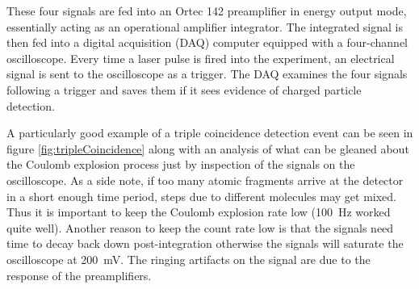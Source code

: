 These four signals are fed into an Ortec 142 preamplifier in energy output mode, essentially acting as an operational amplifier integrator. The integrated signal is then fed into a digital acquisition (DAQ) computer equipped with a four-channel oscilloscope. Every time a laser pulse is fired into the experiment, an electrical signal is sent to the oscilloscope as a trigger. The DAQ examines the four signals following a trigger and saves them if it sees evidence of charged particle detection.

A particularly good example of a triple coincidence detection event can be seen in figure \ref{fig:tripleCoincidence} along with an analysis of what can be gleaned about the Coulomb explosion process just by inspection of the signals on the oscilloscope. As a side note, if too many atomic fragments arrive at the detector in a short enough time period, steps due to different molecules may get mixed. Thus it is important to keep the Coulomb explosion rate low (\SI{100}{\Hz} worked quite well). Another reason to keep the count rate low is that the signals need time to decay back down post-integration otherwise the signals will saturate the oscilloscope at \SI{200}{\mV}. The ringing artifacts on the signal are due to the response of the preamplifiers.

